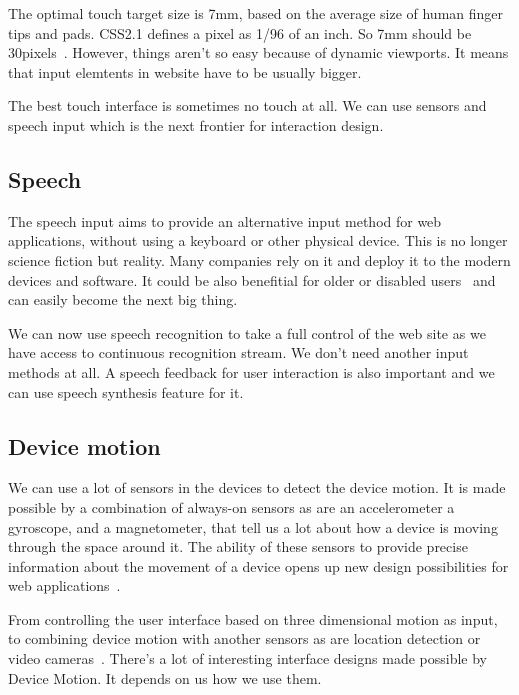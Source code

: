 \documentclass{iitsrc}
\begin{document}
The optimal touch target size is 7mm, based on the average size of human finger tips and pads. CSS2.1 defines a pixel as 1/96 of an inch. So 7mm should be 30pixels~\cite{designingfortouch}. However, things aren’t so easy because of dynamic viewports. It means that input elemtents in website have to be usually bigger.

The best touch interface is sometimes no touch at all. We can use sensors and speech input which is the next frontier for interaction design.


\subsection{Speech} %
\label{sub:speech}

The speech input aims to provide an alternative input method for web applications, without using a keyboard or other physical device. This is no longer science fiction but reality. Many companies rely on it and deploy it to the modern devices and software. It could be also benefitial for older or disabled users~\cite{SpeechRecognition} and can easily become the next big thing.

We can now use speech recognition to take a full control of the web site as we have access to continuous recognition stream. We don't need another input methods at all. A speech feedback for user interaction is also important and we can use speech synthesis feature for it.


\subsection{Device motion} %
\label{sub:device_motion}

We can use a lot of sensors in the devices to detect the device motion. It is made possible by a combination of always-on sensors as are an accelerometer a gyroscope, and a magnetometer, that tell us a lot about how a device is moving through the space around it. The ability of these sensors to provide precise information about the movement of a device opens up new design possibilities for web applications~\cite{ultrabooks}.

From controlling the user interface based on three dimensional motion as input, to combining device motion with another sensors as are location detection or video cameras~\cite{AccelerationAndGyroscope}. There's a lot of interesting interface designs made possible by Device Motion. It depends on us how we use them.
\end{document}
